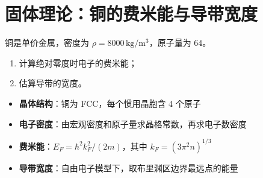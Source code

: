 \section{固体理论：铜的费米能与导带宽度}
\label{sec:copper-fermi-energy}

\begin{modelbox}[题目：单价金属铜的自由电子参数计算]
铜是单价金属，密度为 $\rho=8000\,\mathrm{kg/m^3}$，原子量为 $64$。
\begin{enumerate}
    \item 计算绝对零度时电子的费米能；
    \item 估算导带的宽度。
\end{enumerate}
\end{modelbox}

\begin{tipbox}[考点快速分析]
\begin{itemize}
    \item \textbf{晶体结构}：铜为 FCC，每个惯用晶胞含 4 个原子
    \item \textbf{电子密度}：由宏观密度和原子量求晶格常数，再求电子数密度
    \item \textbf{费米能}：$E_F = \hbar^2k_F^2/(2m)$，其中 $k_F=(3\pi^2n)^{1/3}$
    \item \textbf{导带宽度}：自由电子模型下，取布里渊区边界最远点的能量
\end{itemize}
\end{tipbox}

